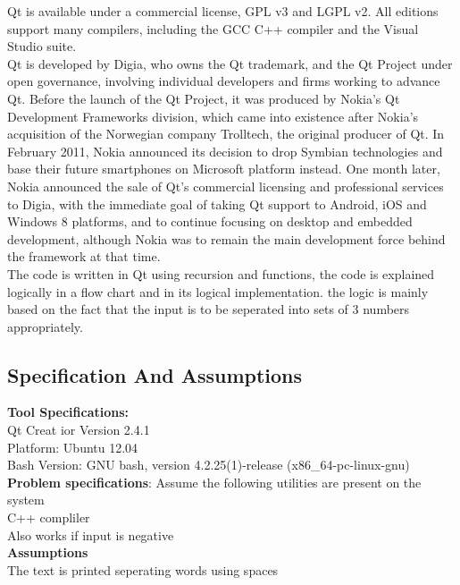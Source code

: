 \documentclass[paper=a4, fontsize=11pt]{scrartcl} %
\numberwithin{equation}{section} %
\numberwithin{figure}{section} %
\numberwithin{table}{section} %
\begin{document}
Qt is available under a commercial license, GPL v3 and LGPL v2. All editions support many compilers, including the GCC C++ compiler and the Visual Studio suite.\\

Qt is developed by Digia, who owns the Qt trademark, and the Qt Project under open governance, involving individual developers and firms working to advance Qt. Before the launch of the Qt Project, it was produced by Nokia's Qt Development Frameworks division, which came into existence after Nokia's acquisition of the Norwegian company Trolltech, the original producer of Qt. In February 2011, Nokia announced its decision to drop Symbian technologies and base their future smartphones on Microsoft platform instead. One month later, Nokia announced the sale of Qt's commercial licensing and professional services to Digia, with the immediate goal of taking Qt support to Android, iOS and Windows 8 platforms, and to continue focusing on desktop and embedded development, although Nokia was to remain the main development force behind the framework at that time.\\

The code is written in Qt using recursion and functions, the code is explained logically in a flow chart and in its logical implementation. the logic is mainly based on the fact that the input is to be seperated into sets of 3 numbers appropriately.\\

\newpage
\subsection{Specification And Assumptions}
{\textbf {Tool Specifications:}}\\
Qt Creat ior Version 2.4.1\\
Platform: Ubuntu 12.04\\
Bash Version: GNU bash, version 4.2.25(1)-release (x86\_64-pc-linux-gnu)\\

\textbf{Problem specifications}:
Assume the following utilities are present on the system\\
C++ compliler\\
Also works if input is negative\\


{\textbf{Assumptions}}\\
The text is printed seperating words using spaces\\
\end{document}
